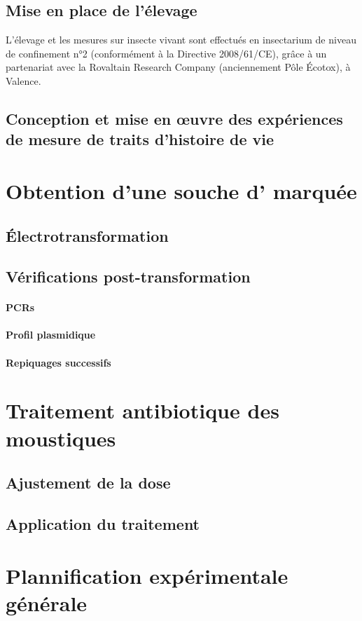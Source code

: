 \subsection{Mise en place de l'élevage}

L'élevage et les mesures sur insecte vivant sont effectués en insectarium de niveau de confinement n°2 (conformément à la Directive 2008/61/CE), grâce à un partenariat avec la Rovaltain Research Company (anciennement Pôle Écotox), à Valence.

\subsection{Conception et mise en œuvre des expériences de mesure de traits d'histoire de vie}

\section{Obtention d'une souche d' marquée}

\subsection{Électrotransformation}

\subsection{Vérifications post-transformation}

\paragraph{PCRs}
\paragraph{Profil plasmidique}
\paragraph{Repiquages successifs}

\section{Traitement antibiotique des moustiques}

\subsection{Ajustement de la dose}

\subsection{Application du traitement}

\section{Plannification expérimentale générale}